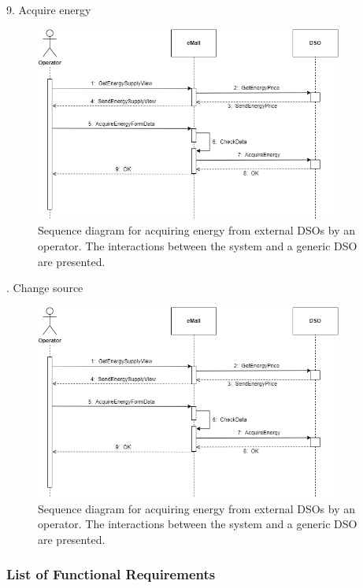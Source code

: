 \documentclass[../main.tex]{subfiles}
\begin{document}
9. Acquire energy
\begin{figure}[H]
    \centering
    \includegraphics[width=0.9\textwidth]{sequences/sd_acquire.png}
    \caption{Sequence diagram for acquiring energy from external DSOs by an operator. The interactions between the system and a generic DSO are presented.}
    \label{fig:acquire}
\end{figure}

. Change source
\begin{figure}[H]
    \centering
    \includegraphics[width=0.9\textwidth]{sequences/sd_acquire.png}
    \caption{Sequence diagram for acquiring energy from external DSOs by an operator. The interactions between the system and a generic DSO are presented.}
    \label{fig:acquire}
\end{figure}


\subsubsection{List of Functional Requirements}
\end{document}
